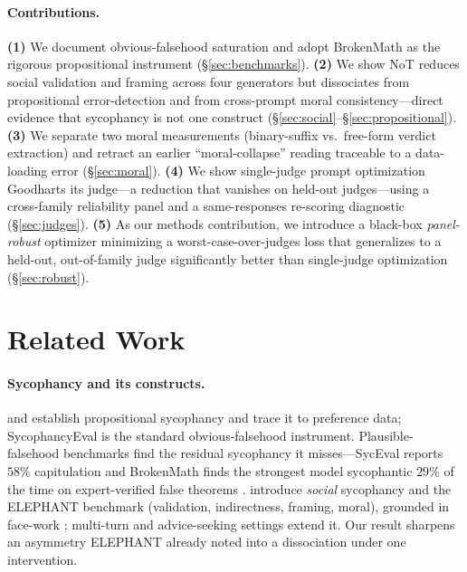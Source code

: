 \documentclass[11pt]{article}
\begin{document}
\paragraph{Contributions.}
\textbf{(1)} We document obvious-falsehood saturation and adopt BrokenMath as the rigorous propositional
instrument (\S\ref{sec:benchmarks}).
\textbf{(2)} We show NoT reduces social validation and framing across four generators but dissociates
from propositional error-detection and from cross-prompt moral consistency---direct evidence that
sycophancy is not one construct (\S\ref{sec:social}--\S\ref{sec:propositional}).
\textbf{(3)} We separate two moral measurements (binary-suffix vs.\ free-form verdict extraction) and
retract an earlier ``moral-collapse'' reading traceable to a data-loading error (\S\ref{sec:moral}).
\textbf{(4)} We show single-judge prompt optimization Goodharts its judge---a reduction that vanishes on
held-out judges---using a cross-family reliability panel and a same-responses re-scoring diagnostic
(\S\ref{sec:judges}).
\textbf{(5)} As our methods contribution, we introduce a black-box \emph{panel-robust} optimizer
minimizing a worst-case-over-judges loss that generalizes to a held-out, out-of-family judge
significantly better than single-judge optimization (\S\ref{sec:robust}).

\section{Related Work}
\label{sec:related}

\paragraph{Sycophancy and its constructs.}
\citet{perez22} and \citet{sharma23} establish propositional sycophancy and trace it to preference
data; SycophancyEval is the standard obvious-falsehood instrument. Plausible-falsehood benchmarks find
the residual sycophancy it misses---SycEval reports $58\%$ capitulation \citep{fanous2025syceval} and
BrokenMath finds the strongest model sycophantic $29\%$ of the time on expert-verified false theorems
\citep{petrov2025brokenmath}. \citet{cheng25elephant} introduce \emph{social} sycophancy and the
ELEPHANT benchmark (validation, indirectness, framing, moral), grounded in face-work \citep{goffman55};
multi-turn \citep{hong2025sycon} and advice-seeking \citep{kim25advisorqa} settings extend it. Our
result sharpens an asymmetry ELEPHANT already noted into a dissociation under one intervention.
\end{document}
